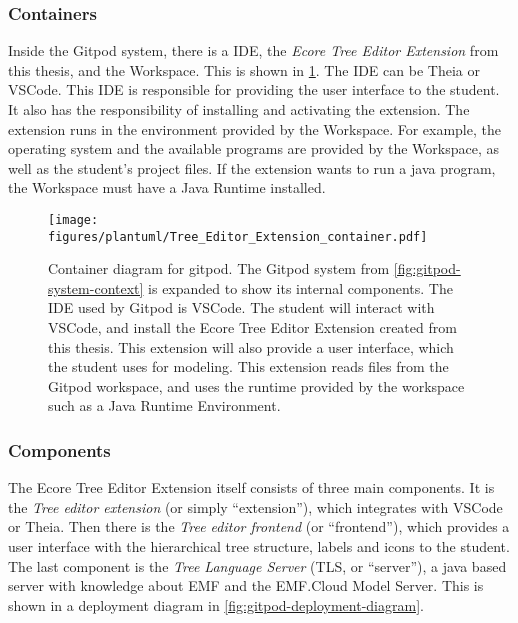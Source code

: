 \subsubsection{Containers}

Inside the \gls{Gitpod} system, there is a \acrshort{IDE}, the \textit{Ecore Tree Editor Extension} from this thesis, and the Workspace.
This is shown in \cref{fig:gitpod-container-diagram}.
The \acrshort{IDE} can be \gls{Theia} or \gls{VSCode}.
This \acrshort{IDE} is responsible for providing the user interface to the student.
It also has the responsibility of installing and activating the extension.
The extension runs in the environment provided by the Workspace.
For example, the operating system and the available programs are provided by the Workspace, as well as the student's project files.
If the extension wants to run a java program, the Workspace must have a Java Runtime installed.

\begin{figure}[H]  %
  \centering
  \texttt{[image: figures/plantuml/Tree\_Editor\_Extension\_container.pdf]}
  \caption[Gitpod container diagram]{Container diagram for gitpod. The Gitpod system from \cref{fig:gitpod-system-context} is expanded to show its internal components. The \acrshort{IDE} used by Gitpod is \gls{VSCode}.
  The student will interact with VSCode, and install the Ecore Tree Editor Extension created from this thesis.
  This extension will also provide a user interface, which the student uses for modeling.
  This extension reads files from the Gitpod workspace, and uses the runtime provided by the workspace such as a Java Runtime Environment.}\label{fig:gitpod-container-diagram}
\end{figure}


\subsubsection{Components}

The Ecore Tree Editor Extension itself consists of three main components.
It is the \textit{Tree editor extension} (or simply ``extension''), which integrates with \gls{VSCode} or \gls{Theia}.
Then there is the \textit{Tree editor frontend} (or ``frontend''), which provides a user interface with the hierarchical tree structure, labels and icons to the student.
The last component is the \textit{Tree Language Server} (TLS, or ``server''), a java based server with knowledge about \acrshort{EMF} and the EMF.Cloud Model Server.
This is shown in a deployment diagram in \cref{fig:gitpod-deployment-diagram}.\\


